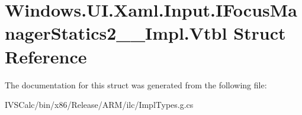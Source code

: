 \hypertarget{struct_windows_1_1_u_i_1_1_xaml_1_1_input_1_1_i_focus_manager_statics2_____impl_1_1_vtbl}{}\section{Windows.\+U\+I.\+Xaml.\+Input.\+I\+Focus\+Manager\+Statics2\+\_\+\+\_\+\+Impl.\+Vtbl Struct Reference}
\label{struct_windows_1_1_u_i_1_1_xaml_1_1_input_1_1_i_focus_manager_statics2_____impl_1_1_vtbl}


The documentation for this struct was generated from the following file\+:\begin{DoxyCompactItemize}
\item 
I\+V\+S\+Calc/bin/x86/\+Release/\+A\+R\+M/ilc/Impl\+Types.\+g.\+cs\end{DoxyCompactItemize}
